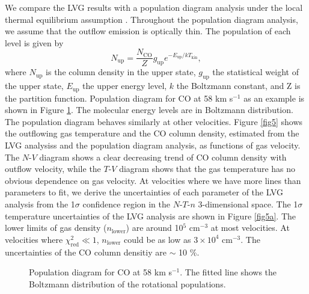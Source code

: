 We compare the LVG results with a population diagram analysis under the local thermal equilibrium assumption \citep{1999ApJ...517..209G}. Throughout the population diagram analysis, we assume that the outflow emission is optically thin. The population of each level is given by 
\begin{equation}
N_{\mathrm{up}} = \frac{N_\mathrm{CO}}{Z} g_\mathrm{up} e^{-E_\mathrm{up}/kT_\mathrm{kin}},
\end{equation}
where $N_\mathrm{up}$ is the column density in the upper state, $g_\mathrm{up}$ the statistical weight of the upper state, $E_\mathrm{up}$ the upper energy level, $k$ the Boltzmann constant, and Z is the partition function.
Population diagram for CO at 58 km s$^{-1}$ as an example is shown in Figure \ref{fig4}. The molecular energy levels are in Boltzmann distribution. The population diagram behaves similarly at other velocities. Figure \ref{fig5} shows the outflowing gas temperature and the CO column density, estimated from the LVG analysiss and the population diagram analysis, as functions of gas velocity. The $N$-$V$ diagram shows a clear decreasing trend of CO column density with outflow velocity, while the $T$-$V$ diagram shows that the gas temperature has no obvious dependence on gas velocity. At velocities where we have more lines than parameters to fit, we derive the uncertainties of each parameter of the LVG analysis from the 1$\sigma$ confidence region in the $N$-$T$-$n$ 3-dimensional space. The 1$\sigma$ temperature uncertainties of the LVG analysis are shown in Figure \ref{fig5a}. The lower limits of gas density ($n_{\mathrm{lower}}$) are around 10$^5$ cm$^{-3}$ at most velocities. At velocities where $\chi_{\mathrm{red}}^2 \ll 1$, $n_{\mathrm{lower}}$ could be as low as $3 \times 10^4$ cm$^{-3}$. The uncertainties of the CO column densitiy are $\sim$ 10 \%. 

\begin{figure}[tbp]
\caption{Population diagram for CO at 58 km s$^{-1}$.  The fitted line shows the Boltzmann distribution of the rotational populations. \label{fig4}}
\end{figure}

